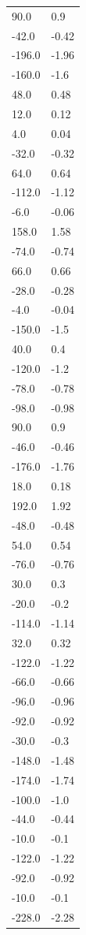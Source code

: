 \begin{longtable}{ll}
90.0 & 0.9 \\
-42.0 & -0.42 \\
-196.0 & -1.96 \\
-160.0 & -1.6 \\
48.0 & 0.48 \\
12.0 & 0.12 \\
4.0 & 0.04 \\
-32.0 & -0.32 \\
64.0 & 0.64 \\
-112.0 & -1.12 \\
-6.0 & -0.06 \\
158.0 & 1.58 \\
-74.0 & -0.74 \\
66.0 & 0.66 \\
-28.0 & -0.28 \\
-4.0 & -0.04 \\
-150.0 & -1.5 \\
40.0 & 0.4 \\
-120.0 & -1.2 \\
-78.0 & -0.78 \\
-98.0 & -0.98 \\
90.0 & 0.9 \\
-46.0 & -0.46 \\
-176.0 & -1.76 \\
18.0 & 0.18 \\
192.0 & 1.92 \\
-48.0 & -0.48 \\
54.0 & 0.54 \\
-76.0 & -0.76 \\
30.0 & 0.3 \\
-20.0 & -0.2 \\
-114.0 & -1.14 \\
32.0 & 0.32 \\
-122.0 & -1.22 \\
-66.0 & -0.66 \\
-96.0 & -0.96 \\
-92.0 & -0.92 \\
-30.0 & -0.3 \\
-148.0 & -1.48 \\
-174.0 & -1.74 \\
-100.0 & -1.0 \\
-44.0 & -0.44 \\
-10.0 & -0.1 \\
-122.0 & -1.22 \\
-92.0 & -0.92 \\
-10.0 & -0.1 \\
-228.0 & -2.28 \\

\end{longtable}
